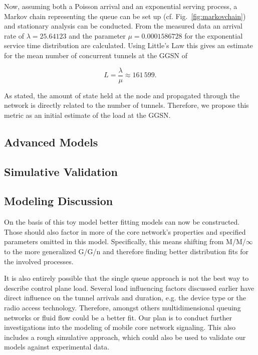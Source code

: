 Now, assuming both a Poisson arrival and an exponential serving process, a Markov chain representing the queue can be set up (cf. Fig.~\ref{fig:markovchain}) and stationary analysis can be conducted. From the measured data an arrival rate of $\lambda=25.64123$ and the parameter $\mu=0.0001586728$ for the exponential service time distribution are calculated. Using Little's Law this gives an estimate for the mean number of concurrent tunnels at the \ac{GGSN} of 

$$
L=\frac{\lambda}{\mu}\approx 161\,599. %
$$

As stated, the amount of state held at the node and propagated through the network is directly related to the number of tunnels. Therefore, we propose this metric as an initial estimate of the load at the \ac{GGSN}.


\subsection{Advanced Models} 



\subsection{Simulative Validation} 



\subsection{Modeling Discussion}

On the basis of this toy model better fitting models can now be constructed. Those should also factor in more of the core network's properties and specified parameters omitted in this model. Specifically, this means shifting from M/M/$\infty$ to the more generalized G/G/n and therefore finding better distribution fits for the involved processes.

It is also entirely possible that the single queue approach is not the best way to describe control plane load. Several load influencing factors discussed earlier have direct influence on the tunnel arrivals and duration, e.g. the device type or the radio access technology. Therefore, amongst others multidimensional queuing networks or fluid flow could be a better fit. Our plan is to conduct further investigations into the modeling of mobile core network signaling. This also includes a rough simulative approach, which could also be used to validate our models against experimental data.

